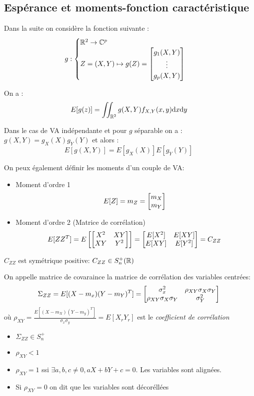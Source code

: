 \documentclass[main.tex]{subfiles}
\begin{document}
\subsection{Espérance et moments-fonction caractéristique}
Dans la suite on considère la fonction suivante :
\[
  g :
  \begin{cases}
    \mathbb{R}^2 \to \mathbb{C}^p\\
Z = (X,Y) \mapsto g(Z) = \begin{bmatrix} g_1(X,Y)\\ \vdots \\ g_p(X,Y) \end{bmatrix}
  \end{cases}
\]
\begin{thm}
  On a :
  \[
    E[g(z)] = \iint_{\mathbb{R}^2} g(X,Y)f_{X,Y}(x,y)\mbox{d} x\mbox{d} y
  \]
\end{thm}
\begin{prop}
  Dans le cas de VA indépendante et  pour $g$ séparable on a : $g(X,Y) = g_X(X)g_Y(Y)$ et alors :
  \[
    E[g(X,Y)]= E[g_X(X)]E[g_Y(Y)]
  \]
\end{prop}
\begin{defin}
  On peux également définir les moments d'un couple de VA:
  \begin{itemize}
  \item Moment d'ordre 1
\[
  E[Z] = m_Z = \begin{bmatrix} m_X\\m_Y \end{bmatrix}
\]
\item Moment d'ordre 2 (Matrice de corrélation)
\[
  E[ZZ^T] =E \left[\begin{bmatrix} X^2 & XY \\ XY & Y^2 \end{bmatrix}
  \right] = \begin{bmatrix} E[X^2] & E[XY] \\ E[XY] & E[Y^2] \end{bmatrix} = C_{ZZ}
\]
\end{itemize}
\end{defin}

\begin{rem}
  $C_{ZZ}$ est symétrique positive: $ C_{ZZ}\in S_n^+(\mathbb{R})$
\end{rem}

\begin{defin}
  On appelle matrice de covaraince la matrice de corrélation des variables centrées:
\[
  \Sigma_{ZZ}= E[(X-m_x)(Y-m_Y)^T] = \begin{bmatrix} \sigma_x^2 & \rho_{XY}\sigma_X\sigma_Y \\  \rho_{XY}\sigma_X\sigma_Y & \sigma_Y^2 \end{bmatrix}
\]
où
$\rho_{XY} = \frac{E[(X-m_X)(Y-m_y)^T]}{\sigma_x\sigma_y} =E[X_rY_r]$ est le \emph{coefficient de corrélation}
\end{defin}


\begin{prop}
  \begin{itemize}
  \item $\Sigma_{ZZ}\in S_n^+$
  \item $ \rho_{XY} < 1$
  \item  $\rho_{XY}=1$ ssi $\exists a,b,c \neq 0, aX+bY+c =0$. Les variables sont alignées.
  \item Si $\rho_{XY}=0$ on dit que les variables sont décoréllées
  \end{itemize}
\end{prop}
\end{document}

